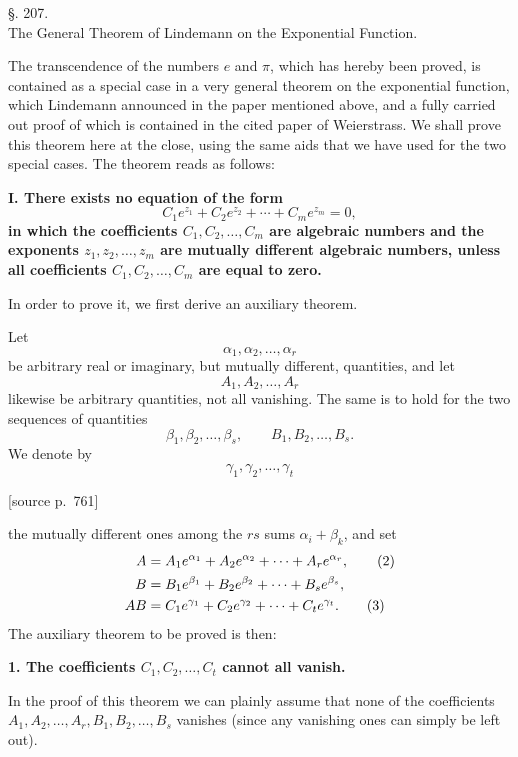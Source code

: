 \documentclass[11pt]{article}
\newcommand{\srcpage}[1]{\par\medskip\noindent\textsf{[source p.~#1]}\par\smallskip}
\begin{document}
\begin{center}
{\large §. 207.}\\[0.4em]
{\large The General Theorem of Lindemann on the Exponential Function.}
\end{center}

The transcendence of the numbers $e$ and $\pi$, which has hereby been proved, is contained as a special case in a very general theorem on the exponential function, which Lindemann announced in the paper mentioned above, and a fully carried out proof of which is contained in the cited paper of Weierstrass. We shall prove this theorem here at the close, using the same aids that we have used for the two special cases. The theorem reads as follows:

\textbf{I. There exists no equation of the form}
\begin{equation}\tag{1}
C_1e^{z_1}+C_2e^{z_2}+\cdots+C_me^{z_m}=0,
\end{equation}
\textbf{in which the coefficients $C_1,C_2,\ldots,C_m$ are algebraic numbers and the exponents $z_1,z_2,\ldots,z_m$ are mutually different algebraic numbers, unless all coefficients $C_1,C_2,\ldots,C_m$ are equal to zero.}

In order to prove it, we first derive an auxiliary theorem.

Let
\[
\alpha_1,\alpha_2,\ldots,\alpha_r
\]
be arbitrary real or imaginary, but mutually different, quantities, and let
\[
A_1,A_2,\ldots,A_r
\]
likewise be arbitrary quantities, not all vanishing. The same is to hold for the two sequences of quantities
\[
\beta_1,\beta_2,\ldots,\beta_s,\qquad
B_1,B_2,\ldots,B_s.
\]
We denote by
\[
\gamma_1,\gamma_2,\ldots,\gamma_t
\]
\srcpage{761}
the mutually different ones among the $rs$ sums $\alpha_i+\beta_k$, and set
\begin{align}
A&=A_1e^{\alpha_1}+A_2e^{\alpha_2}+\cdots+A_re^{\alpha_r},\tag{2}\\
B&=B_1e^{\beta_1}+B_2e^{\beta_2}+\cdots+B_se^{\beta_s},\notag\\
AB&=C_1e^{\gamma_1}+C_2e^{\gamma_2}+\cdots+C_te^{\gamma_t}.\tag{3}
\end{align}
The auxiliary theorem to be proved is then:

\textbf{1. The coefficients $C_1,C_2,\ldots,C_t$ cannot all vanish.}

In the proof of this theorem we can plainly assume that none of the coefficients $A_1,A_2,\ldots,A_r,B_1,B_2,\ldots,B_s$ vanishes (since any vanishing ones can simply be left out).
\end{document}
